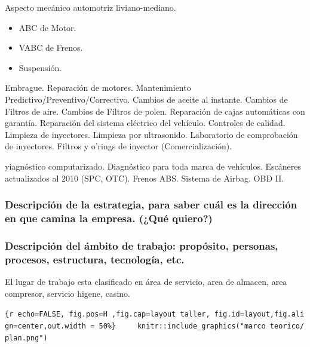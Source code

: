 \documentclass[11pt]{article}
\providecommand{\tightlist}{%
      \setlength{\itemsep}{0pt}\setlength{\parskip}{0pt}}
\begin{document}
Aspecto mecánico automotriz liviano-mediano.

\begin{itemize}
\tightlist
\item
  ABC de Motor.
\item
  VABC de Frenos.
\item
  Suspensión.
\end{itemize}

Embrague. Reparación de motores. Mantenimiento
Predictivo/Preventivo/Correctivo. Cambios de aceite al instante. Cambios
de Filtros de aire. Cambios de Filtros de polen. Reparación de cajas
automáticas con garantía. Reparación del sistema eléctrico del vehículo.
Controles de calidad. Limpieza de inyectores. Limpieza por ultrasonido.
Laboratorio de comprobación de inyectores. Filtros y o'rings de inyector
(Comercialización).

yiagnóstico computarizado. Diagnóstico para toda marca de vehículos.
Escáneres actualizados al 2010 (SPC, OTC). Frenos ABS. Sistema de
Airbag. OBD II.

\hypertarget{descripciuxf3n-de-la-estrategia-para-saber-cuuxe1l-es-la-direcciuxf3n-en-que-camina-la-empresa.-quuxe9-quiero}{%
\subsubsection{Descripción de la estrategia, para saber cuál es la
dirección en que camina la empresa. (¿Qué
quiero?)}\label{descripciuxf3n-de-la-estrategia-para-saber-cuuxe1l-es-la-direcciuxf3n-en-que-camina-la-empresa.-quuxe9-quiero}}

\hypertarget{descripciuxf3n-del-uxe1mbito-de-trabajo-propuxf3sito-personas-procesos-estructura-tecnologuxeda-etc.}{%
\subsubsection{Descripción del ámbito de trabajo: propósito, personas,
procesos, estructura, tecnología,
etc.}\label{descripciuxf3n-del-uxe1mbito-de-trabajo-propuxf3sito-personas-procesos-estructura-tecnologuxeda-etc.}}

El lugar de trabajo esta clasificado en área de servicio, area de
almacen, area compresor, servicio higene, casino.

    \texttt{\{r\ echo=FALSE,\ fig.pos=\textquotesingle{}H\textquotesingle{}\ ,fig.cap=\textquotesingle{}layout\ taller\textquotesingle{},\ fig.id=\textquotesingle{}layout\textquotesingle{},fig.align=\textquotesingle{}center\textquotesingle{},out.width\ =\ \textquotesingle{}50\%\textquotesingle{}\}\ \ \ \ \ knitr::include\_graphics("marco\ teorico/plan.png")}
\end{document}
